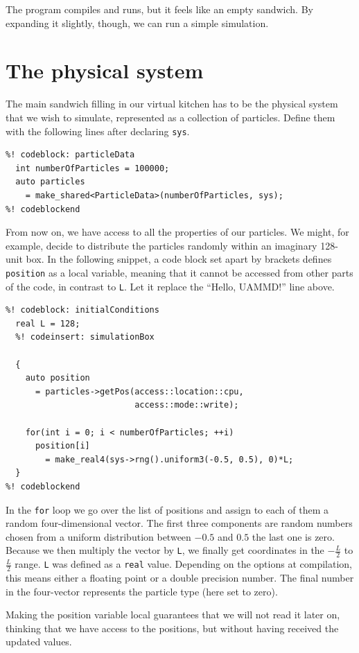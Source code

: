 The program compiles and runs, but it feels like an empty sandwich. By expanding
it slightly, though, we can run a simple simulation.

\section{\label{physical_system}The physical system}

The main sandwich filling in our virtual kitchen has to be the physical system
that we wish to simulate, represented as a collection of particles. Define them
with the following lines after declaring \texttt{sys}.
\begin{lstlisting}
%! codeblock: particleData
  int numberOfParticles = 100000;
  auto particles
    = make_shared<ParticleData>(numberOfParticles, sys);
%! codeblockend
\end{lstlisting}
From now on, we have access to all the properties of our particles. We might, 
for example, decide to distribute the particles randomly within an imaginary 
128-unit box. In the following snippet, a code block set apart by brackets
defines \texttt{position} as a local variable, meaning that it cannot be
accessed from  other parts of the code, in contrast to \texttt{L}. Let it
replace the ``Hello, UAMMD!'' line above.\label{initialConditions}
\begin{lstlisting}
%! codeblock: initialConditions
  real L = 128;
  %! codeinsert: simulationBox

  {
    auto position
      = particles->getPos(access::location::cpu,
                          access::mode::write);

    for(int i = 0; i < numberOfParticles; ++i)
      position[i]
        = make_real4(sys->rng().uniform3(-0.5, 0.5), 0)*L;
  }
%! codeblockend
\end{lstlisting}
In the \texttt{for} loop we go over the list of positions and assign to each of
them a random four-dimensional vector. The first three components are random
numbers chosen from a uniform distribution between $-0.5$ and $0.5$ the last one
is zero. Because we then multiply the vector by \texttt{L}, we finally get
coordinates in the $-\frac{L}{2}$ to $\frac{L}{2}$ range. \texttt{L} was defined
as a \texttt{real} value. Depending on the options at compilation, this means
either a floating point or a double precision number. The final number in the
four-vector represents the particle type (here set to zero).

Making the position variable local guarantees that we will not read it later on,
thinking that we have access to the positions, but without having received the
updated values.

